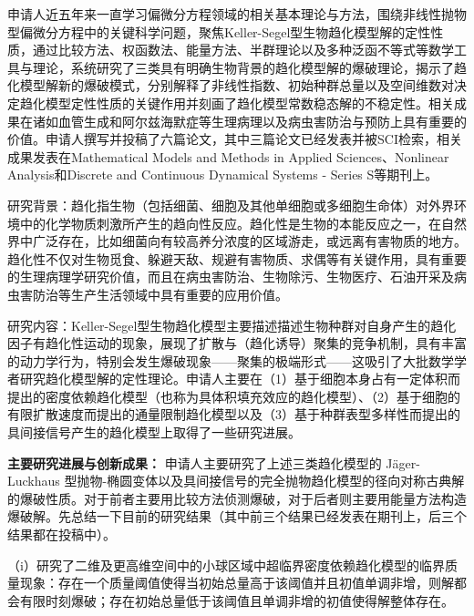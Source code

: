 \documentclass[12pt]{article}
\begin{document}
{


}


申请人近五年来一直学习偏微分方程领域的相关基本理论与方法，围绕非线性抛物型偏微分方程中的关键科学问题，聚焦Keller-Segel型生物趋化模型解的定性性质，通过比较方法、权函数法、能量方法、半群理论以及多种泛函不等式等数学工具与理论，系统研究了三类具有明确生物背景的趋化模型解的爆破理论，揭示了趋化模型解新的爆破模式，分别解释了非线性指数、初始种群总量以及空间维数对决定趋化模型定性性质的关键作用并刻画了趋化模型常数稳态解的不稳定性。相关成果在诸如血管生成和阿尔兹海默症等生理病理以及病虫害防治与预防上具有重要的价值。申请人撰写并投稿了六篇论文，其中三篇论文已经发表并被SCI检索，相关成果发表在Mathematical Models and Methods in Applied Sciences、Nonlinear Analysis和Discrete and Continuous Dynamical Systems - Series S等期刊上。%

研究背景：趋化指生物（包括细菌、细胞及其他单细胞或多细胞生命体）对外界环境中的化学物质刺激所产生的趋向性反应。趋化性是生物的本能反应之一，在自然界中广泛存在，比如细菌向有较高养分浓度的区域游走，或远离有害物质的地方。趋化性不仅对生物觅食、躲避天敌、规避有害物质、求偶等有关键作用，具有重要的生理病理学研究价值，而且在病虫害防治、生物除污、生物医疗、石油开采及病虫害防治等生产生活领域中具有重要的应用价值。

研究内容：Keller-Segel型生物趋化模型主要描述描述生物种群对自身产生的趋化因子有趋化性运动的现象，展现了扩散与（趋化诱导）聚集的竞争机制，具有丰富的动力学行为，特别会发生爆破现象——聚集的极端形式——这吸引了大批数学学者研究趋化模型解的定性理论。申请人主要在（1）基于细胞本身占有一定体积而提出的密度依赖趋化模型（也称为具体积填充效应的趋化模型）、（2）基于细胞的有限扩散速度而提出的通量限制趋化模型以及（3）基于种群表型多样性而提出的具间接信号产生的趋化模型上取得了一些研究进展。

\textbf{主要研究进展与创新成果：}
申请人主要研究了上述三类趋化模型的 J\"ager-Luckhaus 型抛物-椭圆变体以及具间接信号的完全抛物趋化模型的径向对称古典解的爆破性质。对于前者主要用比较方法侦测爆破，对于后者则主要用能量方法构造爆破解。先总结一下目前的研究结果（其中前三个结果已经发表在期刊上，后三个结果都在投稿中）。

（i）研究了二维及更高维空间中的小球区域中超临界密度依赖趋化模型的临界质量现象：存在一个质量阈值使得当初始总量高于该阈值并且初值单调非增，则解都会有限时刻爆破；存在初始总量低于该阈值且单调非增的初值使得解整体存在。
\end{document}
